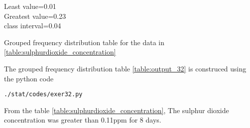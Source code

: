 Least value=0.01\\
Greatest value=0.23\\
class interval=0.04\\
\begin{table}[ht!]
\centering

\caption{Grouped frequency distribution table for the data in \ref{table:sulphurdioxide_concentration}}
\label{table:output_32}
\end{table}
The grouped frequency distribution table \ref{table:output_32} is construced using the python code
\begin{lstlisting}
./stat/codes/exer32.py
\end{lstlisting}
From the table \ref{table:sulphurdioxide_concentration}, The sulphur dioxide concentration was greater than 0.11ppm for 8 days. 
